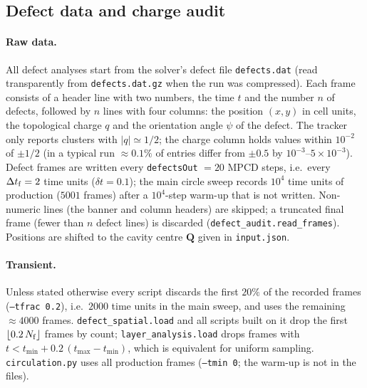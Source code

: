 
\subsection{Defect data and charge audit}
\label{sec:methods-audit}

\paragraph{Raw data.}
All defect analyses start from the solver's defect file \texttt{defects.dat}
(read transparently from \texttt{defects.dat.gz} when the run was compressed).
Each frame consists of a header line with two numbers, the time $t$ and the number
$n$ of defects, followed by $n$ lines with four columns: the position $(x,y)$ in
cell units, the topological charge $q$ and the orientation angle $\psi$ of the defect.
The tracker only reports clusters with $|q|\simeq 1/2$; the charge column holds
values within $10^{-2}$ of $\pm 1/2$ (in a typical run $\approx 0.1\%$ of entries
differ from $\pm0.5$ by $10^{-3}$--$5\times10^{-3}$). Defect frames are written every
\texttt{defectsOut} $=20$ MPCD steps, i.e.\ every $\Delta t_{\rm f}=2$ time units
($\delta t = 0.1$); the main circle sweep records $10^4$ time units of production
($5001$ frames) after a $10^4$-step warm-up that is not written.
Non-numeric lines (the banner and column headers) are skipped; a truncated final frame
(fewer than $n$ defect lines) is discarded (\texttt{defect\_audit.read\_frames}).
Positions are shifted to the cavity centre $\mathbf{Q}$ given in \texttt{input.json}.

\paragraph{Transient.}
Unless stated otherwise every script discards the first $20\%$ of the recorded frames
(\texttt{--tfrac 0.2}), i.e.\ $2000$ time units in the main sweep, and uses the remaining
$\approx 4000$ frames. \texttt{defect\_spatial.load} and all scripts built on it drop
the first $\lfloor 0.2\,N_{\rm f}\rfloor$ frames by count; \texttt{layer\_analysis.load}
drops frames with $t < t_{\min}+0.2\,(t_{\max}-t_{\min})$, which is equivalent for
uniform sampling. \texttt{circulation.py} uses all production frames (\texttt{--tmin 0};
the warm-up is not in the files).

